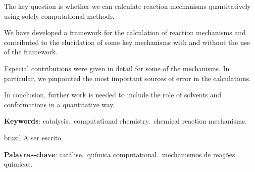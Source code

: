 \setlength{\absparsep}{18pt} %

\begin{resumo}[Abstract]
The key question is whether we can calculate reaction mechanisms quantitatively
using solely computational methods.

We have developed a framework for the calculation of reaction mechanisms and
contributed to the elucidation of some key mechanisms with and without the use
of the framework.

Especial contributions were given in detail for some of the mechanisms.
In particular, we pinpointed the most important sources of error in the
calculations.

In conclusion, further work is needed to include the role of solvents and
conformations in a quantitative way.

\vspace{\onelineskip}

\noindent
\textbf{Keywords}: catalysis.\ computational chemistry.\ chemical reaction mechanisms.
\end{resumo}

\begin{resumo}[Resumo]
\begin{otherlanguage*}{brazil}
A ser escrito.

\vspace{\onelineskip}

\noindent
\textbf{Palavras-chave}: catálise.\ química computational.\ mechanismos de
reações químicas.
\end{otherlanguage*}
\end{resumo}
